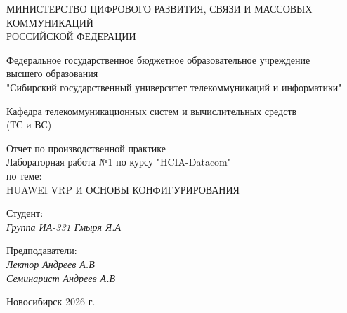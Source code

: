 \thispagestyle{empty}

\begin{center}
    МИНИСТЕРСТВО ЦИФРОВОГО РАЗВИТИЯ, СВЯЗИ И МАССОВЫХ КОММУНИКАЦИЙ \\ РОССИЙСКОЙ ФЕДЕРАЦИИ

    \vspace{20pt}

    Федеральное государственное бюджетное образовательное учреждение  \\  высшего образования \\
    "Сибирский государственный университет телекоммуникаций и информатики" \\

    \vspace{20pt}

    Кафедра телекоммуникационных систем и вычислительных средств \\  (ТС и ВС)
\end{center}

\vfill

\begin{center}
    Отчет по производственной практике \\  
    Лабораторная работа №1 по курсу "HCIA-Datacom"\\
    \vspace{20pt}
    по теме: \\
    \uppercase{Huawei VRP и основы конфигурирования}
\end{center}

\vfill

    \noindent Студент: \\
    \textit{Группа ИА-331 \hfill Гмыря Я.А} 

    \vspace{20pt}
 
    \noindent Предподаватели: \\
    \textit{Лектор \hfill Андреев А.В} \\
    \textit{Семинарист \hfill Андреев А.В}

\vfill

\begin{center}
    Новосибирск 2026 г.
\end{center}